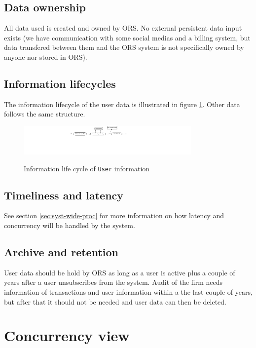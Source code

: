 \subsection{Data ownership}
\label{sec:data-ownership}
All data used is created and owned by ORS. No external persistent data input exists (we have communication with some social medias and a billing system, but data transfered between them and the ORS system is not specifically owned by anyone nor stored in ORS).


\subsection{Information lifecycles}
\label{sec:inform-lifecycl}
The information lifecycle of the user data is illustrated in figure \ref{fig:info_lifecyc0}. Other data follows the same structure.

\begin{figure}[h!]
  \centering
  \caption{Information life cycle of \texttt{User} information}
  \includegraphics[width=0.8\textwidth]{figures/information_lifecycle0}
  \label{fig:info_lifecyc0}
\end{figure}


\subsection{Timeliness and latency}
\label{sec:timeliness-latency}
See section \ref{sec:syst-wide-proc} for more information on how latency and concurrency will be handled by the system.


\subsection{Archive and retention}
\label{sec:archive-retention}
User data should be hold by ORS as long as a user is active plus a couple of years after a user unsubscribes from the system. Audit of the firm needs information of transactions and user information within a the last couple of years, but after that it should not be needed and user data can then be deleted.

\newpage
\section{Concurrency view}
\label{sec:concurrency-view}


